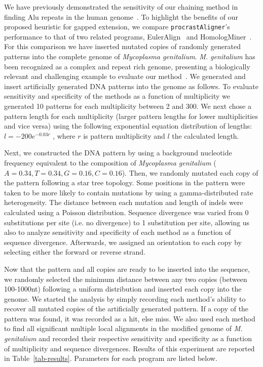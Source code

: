\documentclass[twoside,11pt]{article}
\begin{document}
We have previously demonstrated the sensitivity of our chaining method in finding Alu repeats in
the human genome~\cite{ref-procrast}. To highlight the benefits of our proposed heuristic for gapped extension, we compare \texttt{procrastAligner}'s performance to that of two related programs, EulerAlign~\cite{ref-related1} and HomologMiner~\cite{ref-homologminer}. For this comparison we have inserted mutated copies of randomly generated patterns into the complete genome of \emph{Mycoplasma genitalium}. \emph{M. genitalium} has been recognized as a complex and repeat rich genome, presenting a biologically relevant and challenging example to evaluate our method~\cite{ref-mycoplasma}. We generated and insert artificially generated DNA patterns into the genome as follows. To evaluate sensitivity and specificity of the methods as a function of multiplicity we generated 10 patterns for each multiplicity between 2 and 300. We next chose a pattern length for each multiplicity (larger pattern lengths for lower multiplicities and vice versa) using the following exponential equation distribution of lengths: $l = -200e^{-0.03r}$ , where $r$ is pattern multiplicity and $l$ the calculated length.

Next, we constructed the DNA pattern by using a background nucleotide frequency equivalent to the composition of \emph{Mycoplasma genitalium} ($A=0.34,T=0.34,G=0.16,C=0.16$). Then, we randomly mutated each copy of the pattern following a star tree topology. Some positions in the pattern were taken to be more likely to contain mutations by using a gamma-distributed rate heterogeneity. The distance between each mutation and length of indels were calculated using a Poisson distribution. Sequence divergence was varied from 0 substitutions per site (i.e. no divergence) to 1 substitution per site, allowing us also to analyze sensitivity and specificity of each method as a function of sequence divergence. Afterwards, we assigned an orientation to each copy by selecting either the forward or reverse strand.

Now that the pattern and all copies are ready to be inserted into the sequence, we randomly selected the minimum distance between any two copies (between 100-1000nt) following a uniform distribution and inserted each copy into the genome.  We started the analysis by simply recording each method's ability to recover all mutated copies of the  artificially generated pattern. If a copy of the pattern was found, it was recorded as a hit, else miss. We also used each method to find all significant multiple local alignments in the modified genome of \emph{M. genitalium} and recorded their respective sensitivity and specificity as a function of multiplicity and sequence divergences. Results of this experiment are reported in Table~\ref{tab-results}. Parameters for each program are listed below.
\end{document}
